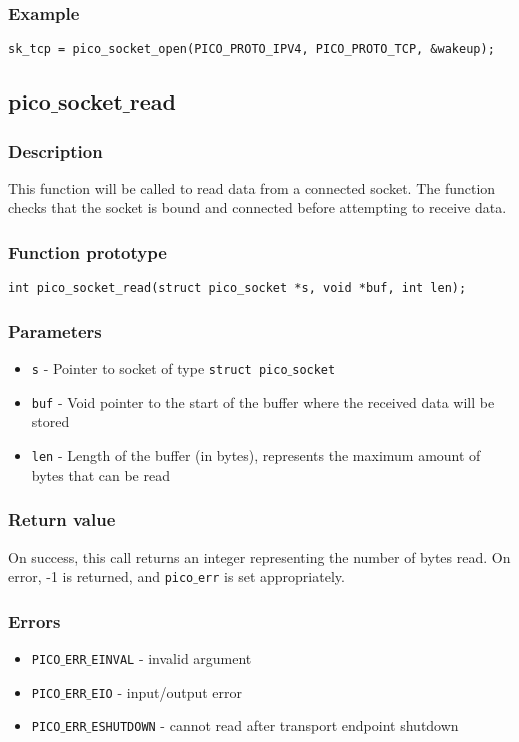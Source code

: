 \subsubsection*{Example}
\begin{verbatim}
sk_tcp = pico_socket_open(PICO_PROTO_IPV4, PICO_PROTO_TCP, &wakeup);
\end{verbatim}


\subsection{pico$\_$socket$\_$read}

\subsubsection*{Description}
This function will be called to read data from a connected socket. The function checks that the socket is bound and connected before attempting to receive data. 

\subsubsection*{Function prototype}
\begin{verbatim}
int pico_socket_read(struct pico_socket *s, void *buf, int len);
\end{verbatim}

\subsubsection*{Parameters}
\begin{itemize}[noitemsep]
\item \texttt{s} - Pointer to socket of type \texttt{struct pico$\_$socket}
\item \texttt{buf} - Void pointer to the start of the buffer where the received data will be stored
\item \texttt{len} - Length of the buffer (in bytes), represents the maximum amount of bytes that can be read
\end{itemize}

\subsubsection*{Return value}
On success, this call returns an integer representing the number of bytes read.
On error, -1 is returned, and \texttt{pico$\_$err} is set appropriately.

\subsubsection*{Errors}
\begin{itemize}[noitemsep]
\item \texttt{PICO$\_$ERR$\_$EINVAL} - invalid argument
\item \texttt{PICO$\_$ERR$\_$EIO} - input/output error
\item \texttt{PICO$\_$ERR$\_$ESHUTDOWN} - cannot read after transport endpoint shutdown
\end{itemize}

